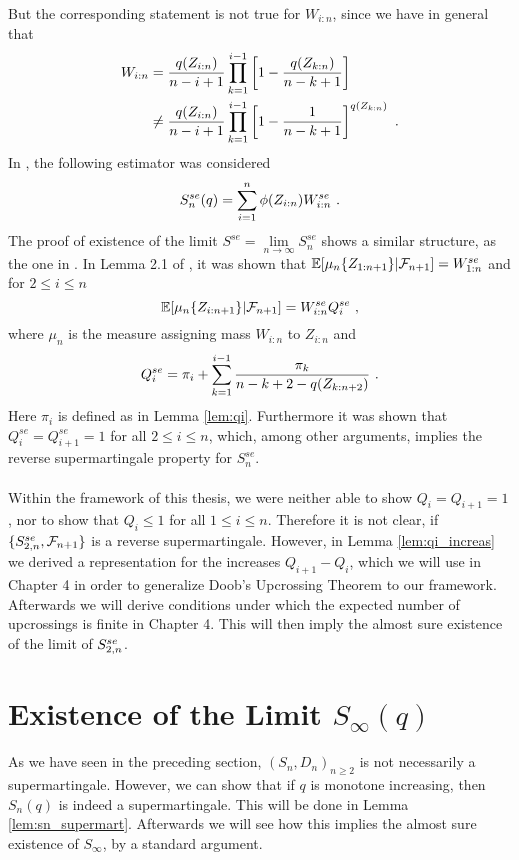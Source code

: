 %
But the corresponding statement is not true for $W_{i:n}$, since we have in general that
\begin{align*}
W_{i:n} &= \frac{q(Z_{i:n})}{n-i+1}\prod\limits_{k=1}^{i-1}\left[1-\frac{q(Z_{k:n})}{n-k+1}\right] \\
&\neq \frac{q(Z_{i:n})}{n-i+1}\prod\limits_{k=1}^{i-1}\left[1-\frac{1}{n-k+1}\right]^{q(Z_{k:n})}\textrm{ .}
\end{align*}
%
In \cite{dikta2000strong}, the following estimator was considered
$$S_n^{se}(q) = \sum_{i=1}^n \phi(Z_{i:n}) W_{i:n}^{se}\textrm{ .}$$
The proof of existence of the limit $S^{se} = \lim\limits_{n\to\infty} S_n^{se}$ shows a similar structure, as the one in \cite{bose1999strong}. In Lemma 2.1 of \cite{dikta2000strong}, it was shown that $\mathbb{E}[\mu_n\{Z_{1:n+1}\} | \mathcal{F}_{n+1}] = W_{1:n}^{se}$ and for $2\leq i\leq n$
$$\mathbb{E}[\mu_n\{Z_{i:n+1}\} | \mathcal{F}_{n+1}] = W_{i:n}^{se}Q_i^{se}\textrm{ ,}$$
where $\mu_n$ is the measure assigning mass $W_{i:n}$ to  $Z_{i:n}$ and
$$Q_i^{se} = \pi_i + \sum_{k=1}^{i-1} \frac{\pi_k}{n-k+2-q(Z_{k:n+2})}\textrm{ .}$$
Here $\pi_i$ is defined as in Lemma \ref{lem:qi}. Furthermore it was shown that $Q_i^{se} = Q_{i+1}^{se} = 1$ for all $2\leq i\leq n$, which, among other arguments, implies the reverse supermartingale property for $S_n^{se}$.\\
\\
 Within the framework of this thesis, we were neither able to show $Q_i = Q_{i+1} = 1$, nor to show that $Q_i \leq 1$ for all $1\leq i\leq n$. Therefore it is not clear, if $\{S_{2,n}^{se}, \mathcal{F}_{n+1}\}$ is a reverse supermartingale. However, in Lemma \ref{lem:qi_increas} we derived a representation for the increases $Q_{i+1} - Q_i$, which we will use in Chapter 4 in order to  generalize Doob's Upcrossing Theorem to our framework. Afterwards we will derive conditions under which the expected number of upcrossings is finite in Chapter 4. This will then imply the almost sure existence of the limit of $S_{2,n}^{se}$.

\section{Existence of the Limit $S_\infty(q)$}
As we have seen in the preceding section, $(S_n, D_n)_{n\geq 2}$ is not necessarily a supermartingale. However, we can show that if $q$ is monotone increasing, then $S_n(q)$ is indeed a supermartingale. This will be done in Lemma \ref{lem:sn_supermart}. Afterwards we will see how this implies the almost sure existence of $S_\infty$, by a standard argument. 

